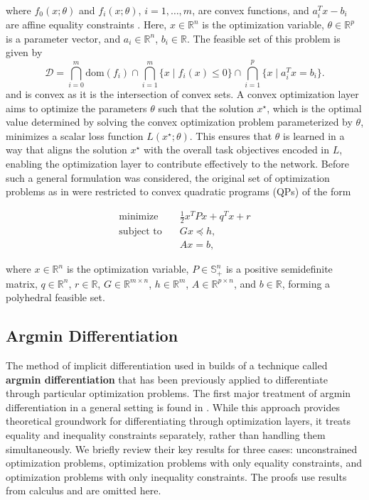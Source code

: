 \documentclass{article}
\begin{document}
where $f_0(x; \theta)$ and $f_i(x; \theta)$, $i = 1, \ldots, m$, are convex functions, and $a_i^T x - b_i$ are affine equality constraints \citet{boyd2004convex}. Here, $x \in \mathbb{R}^n$ is the optimization variable, $\theta \in \mathbb{R}^p$ is a parameter vector, and $a_i \in \mathbb{R}^n$, $b_i \in \mathbb{R}$. The feasible set of this problem is given by \[\mathcal{D} = \bigcap_{i=0}^m \text{dom}(f_i) \cap \bigcap_{i=1}^m \{x \mid f_i(x) \leq 0\} \cap \bigcap_{i=1}^p \{x \mid a_i^T x = b_i\}.
\] and is convex as it is the intersection of convex sets. A convex optimization layer aims to optimize the parameters \(\theta\) such that the solution \(x^\star\), which is the optimal value determined by solving the convex optimization problem parameterized by \(\theta\), minimizes a scalar loss function \(L(x^\star; \theta)\). This ensures that \(\theta\) is learned in a way that aligns the solution \(x^\star\) with the overall task objectives encoded in \(L\), enabling the optimization layer to contribute effectively to the network. Before such a general formulation was considered, the original set of optimization problems as in \citet{optnet} were restricted to convex quadratic programs (QPs) of the form

\begin{equation}
\begin{aligned}
    \text{minimize} \quad & \frac{1}{2} x^T P x + q^T x + r \\
    \text{subject to} \quad & Gx \preceq h, \\
                             & Ax = b,
\end{aligned}
\end{equation}

where \(x \in \mathbb{R}^n\) is the optimization variable, \(P \in \mathbb{S}_+^n\) is a positive semidefinite matrix, \(q \in \mathbb{R}^n\), \(r \in \mathbb{R}\), \(G \in \mathbb{R}^{m \times n}\), \(h \in \mathbb{R}^m\), \(A \in \mathbb{R}^{p \times n}\), and \(b \in \mathbb{R}\), forming a polyhedral feasible set. 

\subsection{Argmin Differentiation}

The method of implicit differentiation used in \citet{optnet} builds of a technique called \textbf{argmin differentiation} that has been previously applied to differentiate through particular optimization problems. The first major treatment of argmin differentiation in a general setting is found in \citet{gould2016differentiating}. While this approach provides theoretical groundwork for differentiating through optimization layers, it treats equality and inequality constraints separately, rather than handling them simultaneously. We briefly review their key results for three cases: unconstrained optimization problems, optimization problems with only equality constraints, and optimization problems with only inequality constraints. The proofs use results from calculus and are omitted here. 
\end{document}
